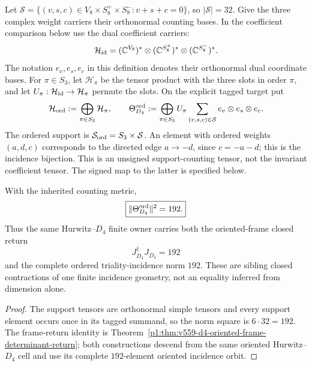 \documentclass[11pt]{article}
\begin{document}
\begin{definition}
\label{p1:def:v561-d4-triality-incidence-tensor}
Let \(\mathcal S=\{(v,s,c)\in V_8\times S_8^+\times S_8^-:
v+s+c=0\}\), so \(|\mathcal S|=32\). Give the three complex weight
carriers their orthonormal counting bases. In the coefficient comparison
below use the dual coefficient carriers:
\[
 \mathcal H_{\rm id}
 =(\mathbb C^{V_8})^*\otimes(\mathbb C^{S_8^+})^*
                              \otimes(\mathbb C^{S_8^-})^*.
\]
The notation \(e_v,e_s,e_c\) in this definition denotes their
orthonormal dual coordinate bases. For \(\pi\in S_3\), let
\(\mathcal H_\pi\) be the tensor product with the three slots in order
\(\pi\), and let \(U_\pi:\mathcal H_{\rm id}\to\mathcal H_\pi\)
permute the slots. On the explicit tagged target put
\[
 \mathcal H_{\rm ord}:=\bigoplus_{\pi\in S_3}\mathcal H_\pi,\qquad
 \Theta_{D_4}^{\rm ord}
 :=\bigoplus_{\pi\in S_3}U_\pi
       \sum_{(v,s,c)\in\mathcal S}e_v\otimes e_s\otimes e_c.
\]
The ordered support is \(\mathcal S_{\rm ord}=S_3\times\mathcal S\).
An element with ordered weights \((a,d,c)\) corresponds to the directed
edge \(a\to-d\), since \(c=-a-d\); this is the incidence bijection.
This is an unsigned support-counting tensor, not the invariant
coefficient tensor. The signed map to the latter is specified below.
\end{definition}

\begin{corollary}
\label{p1:cor:v561-triality-parent-norm-192}
With the inherited counting metric,
\[
 \boxed{\|\Theta_{D_4}^{\rm ord}\|^2=192.}
\]
Thus the same Hurwitz--\(D_4\) finite owner carries both the oriented-frame
closed return
\[
 J_{D_4}^{\dagger}J_{D_4}=192
\]
and the complete ordered triality-incidence norm \(192\).  These are sibling
closed contractions of one finite incidence geometry, not an equality inferred
from dimension alone.
\end{corollary}

\begin{proof}
The support tensors are orthonormal simple tensors and every support element
occurs once in its tagged summand, so the norm square is
\(6\cdot32=192\). The frame-return
identity is Theorem~\ref{p1:thm:v559-d4-oriented-frame-determinant-return}; both
constructions descend from the same oriented Hurwitz--\(D_4\) cell and use its
complete \(192\)-element oriented incidence orbit.
\end{proof}
\end{document}

